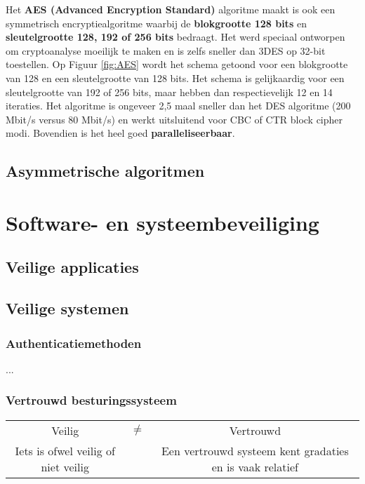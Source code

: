 \documentclass{report}
\begin{document}
	Het \textbf{AES (Advanced Encryption Standard)} algoritme maakt is ook een symmetrisch encryptiealgoritme waarbij de \textbf{blokgrootte 128 bits} en \textbf{sleutelgrootte 128, 192 of 256 bits} bedraagt. Het werd speciaal ontworpen om cryptoanalyse moeilijk te maken en is zelfs sneller dan 3DES op 32-bit toestellen. Op Figuur \ref{fig:AES} wordt het schema getoond voor een blokgrootte van 128 en een sleutelgrootte van 128 bits. Het schema is gelijkaardig voor een sleutelgrootte van 192 of 256 bits, maar hebben dan respectievelijk 12 en 14 iteraties. Het algoritme is ongeveer 2,5 maal sneller dan het DES algoritme (200 Mbit/s versus 80 Mbit/s) en werkt uitsluitend voor CBC of CTR block cipher modi. Bovendien is het heel goed \textbf{paralleliseerbaar}.

	\section{Asymmetrische algoritmen}
	
	
	\chapter{Software- en systeembeveiliging}
	\section{Veilige applicaties}

	\section{Veilige systemen}
	\subsection{Authenticatiemethoden}
	...
	\subsection{Vertrouwd besturingssysteem}

	\begin{table}[ht]
		\centering
		\begin{tabular}{c c c}
			Veilig & $\neq$  & Vertrouwd \\

			Iets is ofwel veilig of niet veilig & & Een vertrouwd systeem kent gradaties en is vaak relatief
		\end{tabular}
	\end{table}
\end{document}
